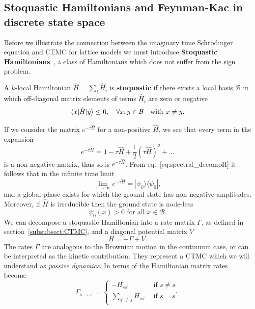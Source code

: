 \subsection{Stoquastic Hamiltonians and Feynman-Kac in discrete state space}
\label{subsec:fk-latt}
Before we illustrate the connection between the imaginary time Schr\" odinger equation and CTMC for lattice models we must introduce \textbf{Stoquastic Hamiltonians}~\cite{bravyi2006complexity}, a class of Hamiltonians which does not suffer from the sign problem.
\begin{definition}
	A $k$-local Hamiltonian $\hat H=\sum_{i} \hat H_{i}$ is \textbf{stoquastic} if there exists a local basis $\mathcal{B}$ in which off-diagonal matrix elements of terms $\hat{H}_i$ are zero or negative
	\begin{equation}
		\langle x|\hat H| y\rangle \leq 0, \quad \forall x, y \in \mathcal{B} \text {\quad with } x \neq y.
	\end{equation}
\end{definition}
If we consider the matrix $e^{-\tau \hat H}$ for a non-positive $\hat H$, we see that every term in the expansion
\begin{equation}
	e^{-\tau \hat{H}} = 1 -\tau \hat{H} + \frac{1}{2}(\tau \hat{H})^2 + \ldots
\end{equation}
is a non-negative matrix, thus so is $e^{-\tau \hat H}$. From eq.~\eqref{eq:spectral_decompH} it follows that in the infinite time limit
\begin{equation}
	\lim _{\tau \rightarrow \infty} e^{-\tau \hat H}=|\psi_0\rangle\langle\psi_0|, 
\end{equation}
and a global phase exists for which the ground state has non-negative amplitudes. Moreover, if $\hat H$ is irreducible then the ground state is node-less~\cite{discussion_stoquastic2017}
\begin{equation}
	\psi_0(x)>0 \text { for all } x \in \mathcal{B}.
\end{equation}
We can decompose a stoquastic Hamiltonian into a rate matrix $\Gamma$, as defined in section~\ref{subsubsect:CTMC}, and a diagonal potential matrix $V$
\begin{equation}
	H=-\Gamma+V.
\end{equation}
The rates $\Gamma$ are analogous to the Brownian motion in the continuum case, or can be interpreted as the kinetic contribution. They represent a CTMC which we will understand as \emph{passive dynamics}. In terms of the Hamiltonian matrix rates become
\begin{equation}
\Gamma_{s \rightarrow s^{\prime}}=\left\{\begin{array}{ll}
-H_{s s^{\prime}} & \text { if } s \neq s \\
\sum_{s^{\prime} \neq s} H_{s s^{\prime}} & \text { if } s=s^{\prime}
\end{array}\right.
\end{equation}
